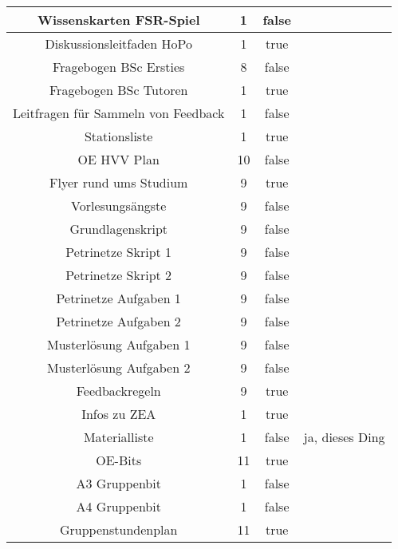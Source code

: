\documentclass[10pt,a4paper,oneside,ngerman,numbers=noenddot]{scrartcl}
\begin{document}
\begin{table}[ht]
\begin{tabular}{c|c|c|c}
		\hline
		Wissenskarten FSR-Spiel & 1 & false & \\
		\hline
		Diskussionsleitfaden HoPo & 1 & true & \\
		\hline
		Fragebogen BSc Ersties & 8 & false & \\
		\hline
		Fragebogen BSc Tutoren & 1 & true & \\
		\hline
		Leitfragen für Sammeln von Feedback & 1 & false & \\
		\hline
		Stationsliste & 1 & true & \\
		\hline
		OE HVV Plan & 10 & false & \\
		\hline
		Flyer rund ums Studium & 9 & true & \\
		\hline
		Vorlesungsängste & 9 & false & \\
		\hline
		Grundlagenskript & 9 & false & \\
		\hline
		Petrinetze Skript 1 & 9 & false & \\
		\hline
		Petrinetze Skript 2 & 9 & false & \\
		\hline
		Petrinetze Aufgaben 1 & 9 & false & \\
		\hline
		Petrinetze Aufgaben 2 & 9 & false & \\
		\hline
		Musterlösung Aufgaben 1 & 9 & false & \\
		\hline
		Musterlösung Aufgaben 2 & 9 & false & \\
		\hline
		Feedbackregeln & 9 & true & \\
		\hline
		Infos zu ZEA & 1 & true & \\
		\hline
		Materialliste & 1 & false & ja, dieses Ding \\
		\hline
		OE-Bits & 11 & true & \\
		\hline
		A3 Gruppenbit & 1 & false & \\
		\hline
		A4 Gruppenbit & 1 & false & \\
		\hline
		Gruppenstundenplan & 11 & true &
	\end{tabular}
\end{table}
\end{document}
